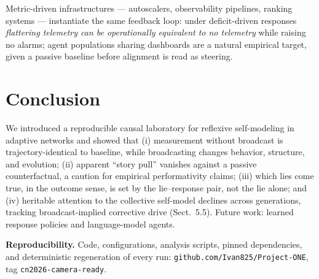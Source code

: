 \documentclass{svproc}
\begin{document}
Metric-driven infrastructures --- autoscalers, observability pipelines,
ranking systems \cite{espeland2007rankings} --- instantiate the same
feedback loop: under
deficit-driven responses \emph{flattering telemetry can be operationally
equivalent to no telemetry} while raising no alarms; agent populations sharing
dashboards \cite{park2023generative} are a natural empirical
target, given a passive baseline before alignment is read as steering.

\section{Conclusion}
We introduced a reproducible causal laboratory for reflexive self-modeling in
adaptive networks and showed that (i) measurement without broadcast is
trajectory-identical to baseline, while broadcasting changes behavior,
structure, and evolution; (ii) apparent ``story pull'' vanishes against a
passive counterfactual, a caution for empirical performativity claims;
(iii) which lies come true, in the outcome sense, is set by the lie--response
pair, not the lie alone; and (iv) heritable attention to the collective
self-model declines across generations, tracking broadcast-implied
corrective drive (Sect.~5.5). Future work: learned response policies and
language-model agents.

\noindent\textbf{Reproducibility.} Code, configurations, analysis scripts,
pinned dependencies, and deterministic regeneration of every run:
\texttt{github.com/Ivan825/Project-ONE}, tag \texttt{cn2026-camera-ready}.
\end{document}
